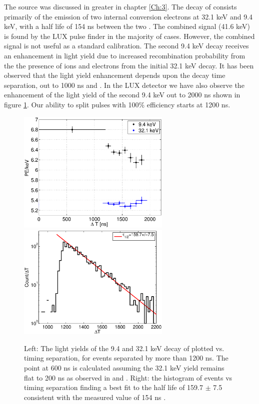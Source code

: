 
The \KrCal source was discussed in greater in chapter \ref{Ch:3}. The decay of \KrCal consists primarily of the emission of two internal conversion electrons at 32.1 keV and 9.4 keV, with a half life of 154 ns between the two \cite{Kastens} \cite{83Kr_HalfLife_1} \cite{83Kr_HalfLife_2} . The combined signal (41.6 keV) is found by the LUX pulse finder in the majority of cases. However, the combined signal is not useful as a standard calibration. The second 9.4 keV decay receives an enhancement in light yield due to increased recombination probability from the the presence of ions and electrons from the initial 32.1 keV decay. It has been observed that the light yield enhancement depends upon the decay time separation, out to 1000 ns \cite{Kastens} and \cite{Baudis}. In the LUX detector we have also observe the enhancement of the light yield of the second 9.4 keV out to 2000 ns shown in figure \ref{fig:Yield_Kr9}. Our ability to split pulses with 100\% efficiency starts at 1200 ns.

 \begin{figure}[h!]\centering
\includegraphics[width=73mm]{Chapter_Flucs/Figures/Kr/dT_lux10_20130510T1250_cp09323} %
\includegraphics[width=73mm]{Chapter_Flucs/Figures/Kr/dT_fit_lux10_20130510T1250}
\caption{Left: The light yields of the 9.4 and 32.1 keV decay of \KrCal plotted vs. timing separation, for events separated by more than 1200 ns. The point at 600 ns is calculated assuming the 32.1 keV yield remains flat to 200 ns as observed in \cite{Kastens} and \cite{Baudis} . Right: the histogram of \KrCal events vs timing separation finding a best fit to the half life of 159.7 $\pm$ 7.5 consistent with the measured value of 154 ns \cite{83Kr_HalfLife_1} \cite{83Kr_HalfLife_2}. }
\label{fig:Yield_Kr9}
\end{figure}

